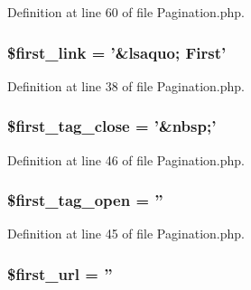Definition at line 60 of file Pagination.\-php.

\hypertarget{class_c_i___pagination_a0236d9345031b8c11db487560609f9a7}{
\subsubsection[{\$first\-\_\-link}]{\setlength{\rightskip}{0pt plus 5cm}\$first\-\_\-link = '\&lsaquo; First'}}\label{class_c_i___pagination_a0236d9345031b8c11db487560609f9a7}


Definition at line 38 of file Pagination.\-php.

\hypertarget{class_c_i___pagination_a1aa5f33d3f661838fa1f8482128a19c7}{
\subsubsection[{\$first\-\_\-tag\-\_\-close}]{\setlength{\rightskip}{0pt plus 5cm}\$first\-\_\-tag\-\_\-close = '\&nbsp;'}}\label{class_c_i___pagination_a1aa5f33d3f661838fa1f8482128a19c7}


Definition at line 46 of file Pagination.\-php.

\hypertarget{class_c_i___pagination_a5e352cfb5a6e9b6f850264aca68f00e0}{
\subsubsection[{\$first\-\_\-tag\-\_\-open}]{\setlength{\rightskip}{0pt plus 5cm}\$first\-\_\-tag\-\_\-open = ''}}\label{class_c_i___pagination_a5e352cfb5a6e9b6f850264aca68f00e0}


Definition at line 45 of file Pagination.\-php.

\hypertarget{class_c_i___pagination_ac7fe85e2fda76364772be52656e346b8}{
\subsubsection[{\$first\-\_\-url}]{\setlength{\rightskip}{0pt plus 5cm}\$first\-\_\-url = ''}}\label{class_c_i___pagination_ac7fe85e2fda76364772be52656e346b8}


